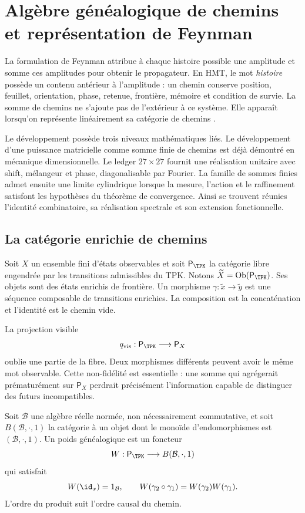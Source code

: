 \chapter{Algèbre généalogique de chemins et représentation de Feynman}
\label{chap:integral-genealogica}

La formulation de Feynman attribue à chaque histoire possible une amplitude et somme
ces amplitudes pour obtenir le propagateur. En HMT, le mot \emph{histoire}
possède un contenu antérieur à l'amplitude : un chemin conserve position, feuillet,
orientation, phase, retenue, frontière, mémoire et condition de survie. La
somme de chemins ne s'ajoute pas de l'extérieur à ce système. Elle apparaît lorsqu'on représente
linéairement sa catégorie de chemins
\cite{Feynman1948,FeynmanHibbs1965}.

Le développement possède trois niveaux mathématiques liés. Le développement d'une
puissance matricielle comme somme finie de chemins est déjà démontré en mécanique
dimensionnelle. Le ledger \(27\times27\) fournit une réalisation unitaire
avec shift, mélangeur et phase, diagonalisable par Fourier. La famille de sommes
finies admet ensuite une limite cylindrique lorsque la mesure, l'action et le
raffinement satisfont les hypothèses du théorème de convergence. Ainsi se trouvent
réunies l'identité combinatoire, sa réalisation spectrale et son extension
fonctionnelle.

\section{La catégorie enrichie de chemins}

Soit \(X\) un ensemble fini d'états observables et soit
\(\mathsf P_{\TPK}\) la catégorie libre engendrée par les transitions
admissibles du TPK. Notons
\(\widetilde X=\operatorname{Ob}(\mathsf P_{\TPK})\). Ses objets sont des états
enrichis de frontière. Un morphisme
\(\gamma:\widetilde x\to\widetilde y\) est une séquence composable de
transitions enrichies.
La composition est la concaténation et l'identité est le chemin vide.

La projection visible
\[
 q_{\rm vis}:\mathsf P_{\TPK}\longrightarrow \mathsf P_X
\]
oublie une partie de la fibre. Deux morphismes différents peuvent avoir le même
mot observable. Cette non-fidélité est essentielle : une somme qui agrégerait prématurément
sur \(\mathsf P_X\) perdrait précisément l'information capable de
distinguer des futurs incompatibles.

\begin{definition}
Soit \(\mathcal B\) une algèbre réelle normée, non nécessairement commutative, et
soit \(B(\mathcal B,\cdot,1)\) la catégorie à un objet dont le monoïde
d'endomorphismes est \((\mathcal B,\cdot,1)\). Un poids généalogique est un foncteur
\[
 W:\mathsf P_{\TPK}\longrightarrow B(\mathcal B,\cdot,1)
\]
qui satisfait
\[
 W(\id_x)=1_{\mathcal B},\qquad
 W(\gamma_2\circ\gamma_1)=W(\gamma_2)W(\gamma_1).
\]
L'ordre du produit suit l'ordre causal du chemin.
\end{definition}


